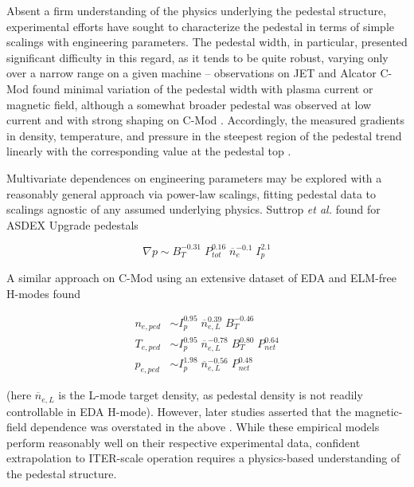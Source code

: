 Absent a firm understanding of the physics underlying the pedestal structure, experimental efforts have sought to characterize the pedestal in terms of simple scalings with engineering parameters.  The pedestal width, in particular, presented significant difficulty in this regard, as it tends to be quite robust, varying only over a narrow range on a given machine \cite{Maggi2010} -- observations on JET \cite{Breger1998} and Alcator C-Mod \cite{Hughes2002,Hughes2007a} found minimal variation of the pedestal width with plasma current or magnetic field, although a somewhat broader pedestal was observed at low current and with strong shaping on C-Mod \cite{Hughes2007,Hughes2007a}.  Accordingly, the measured gradients in density, temperature, and pressure in the steepest region of the pedestal trend linearly with the corresponding value at the pedestal top \cite{Breger1998,Hughes2007a}.

Multivariate dependences on engineering parameters may be explored with a reasonably general approach via power-law scalings, fitting pedestal data to scalings agnostic of any assumed underlying physics.  Suttrop \emph{et al.} \cite{Suttrop1997} found for ASDEX Upgrade pedestals

\begin{equation}
 \nabla p \sim B_T^{-0.31} \; P_{tot}^{0.16} \; \overline{n}_e^{-0.1} \; I_p^{2.1}
\end{equation}

\noindent A similar approach on C-Mod using an extensive dataset of EDA and ELM-free H-modes \cite{Hughes2002} found

\begin{equation}\label{eq:pedfits}
 \begin{aligned}
  n_{e,ped} &\sim I_p^{0.95} \; \overline{n}_{e,L}^{0.39} \; B_T^{-0.46}\\
  T_{e,ped} &\sim I_p^{0.95} \; \overline{n}_{e,L}^{-0.78} \; B_T^{0.80} \; P_{net}^{0.64}\\
  p_{e,ped} &\sim I_p^{1.98} \; \overline{n}_{e,L}^{-0.56} \; P_{net}^{0.48}
 \end{aligned}
\end{equation}

\noindent (here $\overline{n}_{e,L}$ is the L-mode target density, as pedestal density is not readily controllable in EDA H-mode).  However, later studies asserted that the magnetic-field dependence was overstated in the above \cite{Hughes2006}.  While these empirical models perform reasonably well on their respective experimental data, confident extrapolation to ITER-scale operation requires a physics-based understanding of the pedestal structure.

